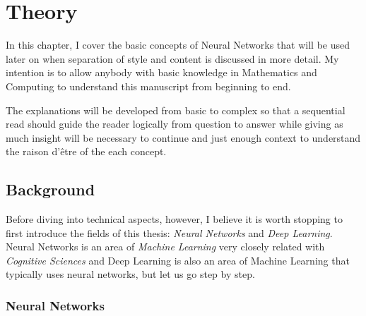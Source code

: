 
\chapter{Theory}
\label{sec:theory}


In this chapter, I cover the basic concepts of Neural Networks that will be used later on when separation of style and content is discussed in more detail.
My intention is to allow anybody with basic knowledge in Mathematics and Computing to understand this manuscript from beginning to end.

The explanations will be developed from basic to complex so that a sequential read should guide the reader logically from question to answer while giving as much insight will be necessary to continue and just enough context to understand the raison d'être of the each concept.



\section{Background}
\label{sec:theory:background}

Before diving into technical aspects, however, I believe it is worth stopping to first introduce the fields of this thesis: \emph{Neural Networks} and \emph{Deep Learning}.
Neural Networks is an area of \emph{Machine Learning} very closely related with \emph{Cognitive Sciences} and Deep Learning is also an area of Machine Learning that typically uses neural networks, but let us go step by step.


\subsection{Neural Networks}
\label{sub:theory:background:neural-networks}

